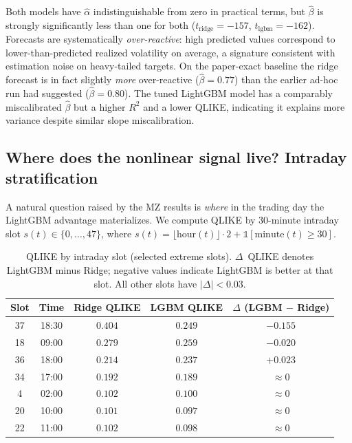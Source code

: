 Both models have $\hat\alpha$ indistinguishable from zero in practical
terms, but $\hat\beta$ is strongly significantly less than one for both
($t_{\text{ridge}} = -157$, $t_{\text{lgbm}} = -162$). Forecasts are
systematically \emph{over-reactive}: high predicted values correspond
to lower-than-predicted realized volatility on average, a signature
consistent with estimation noise on heavy-tailed targets. On the
paper-exact baseline the ridge forecast is in fact slightly
\emph{more} over-reactive ($\hat\beta = 0.77$) than the earlier
ad-hoc run had suggested ($\hat\beta = 0.80$). The tuned LightGBM
model has a comparably miscalibrated $\hat\beta$ but a higher $R^2$
and a lower QLIKE, indicating it explains more variance despite
similar slope miscalibration.

\subsection{Where does the nonlinear signal live? Intraday stratification}
\label{sec:intraday_stratification}

A natural question raised by the MZ results is \emph{where} in the
trading day the LightGBM advantage materializes. We compute QLIKE
by 30-minute intraday slot $s(t) \in \{0, \ldots, 47\}$, where
$s(t) = \lfloor \text{hour}(t) \rfloor \cdot 2 + \mathbb{1}[\text{minute}(t) \ge 30]$.

\begin{table}[H]
\centering
\caption{QLIKE by intraday slot (selected extreme slots). $\Delta$~QLIKE
denotes LightGBM minus Ridge; negative values indicate LightGBM is
better at that slot. All other slots have $|\Delta| < 0.03$.}
\label{tab:qlike_by_slot}
\begin{tabular}{ccccc}
\toprule
Slot & Time & Ridge QLIKE & LGBM QLIKE & $\Delta$ (LGBM $-$ Ridge) \\
\midrule
37 & 18:30 & $\mathbf{0.404}$ & $0.249$ & $\mathbf{-0.155}$ \\
18 & 09:00 & $0.279$          & $0.259$ & $-0.020$ \\
36 & 18:00 & $0.214$          & $0.237$ & $+0.023$ \\
34 & 17:00 & $0.192$          & $0.189$ & $\approx 0$ \\
\midrule
4  & 02:00 & $0.102$          & $0.100$ & $\approx 0$ \\
20 & 10:00 & $0.101$          & $0.097$ & $\approx 0$ \\
22 & 11:00 & $0.102$          & $0.098$ & $\approx 0$ \\
\bottomrule
\end{tabular}
\end{table}

